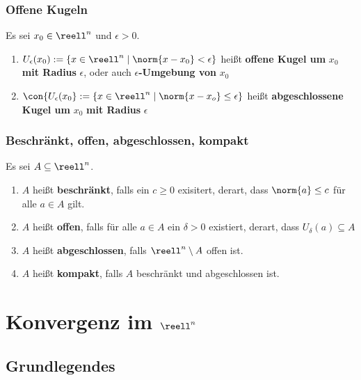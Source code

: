 \documentclass{kit}
\begin{document}
    \subsubsection{Offene Kugeln}
      Es sei $x_0\in\reell^n$ und $\epsilon>0$.
      \begin{enumerate}
        \item $U_\epsilon(x_0):=\{x\in\reell^n\mid\norm{x-x_0}<\epsilon\}$ heißt \textbf{offene Kugel um} $x_0$ 
        \textbf{mit Radius} $\epsilon$, oder auch $\epsilon$\textbf{-Umgebung von} $x_0$
      \item $\con{U_\epsilon(x_0}:=\{x\in\reell^n\mid\norm{x-x_o}\le\epsilon\}$ heißt \textbf{abgeschlossene Kugel um}
        $x_0$ \textbf{mit Radius} $\epsilon$
      \end{enumerate}
    \subsubsection{Beschränkt, offen, abgeschlossen, kompakt}
      Es sei $A\subseteq\reell^n$.
      \begin{enumerate}
        \item $A$ heißt \textbf{beschränkt}, falls ein $c\ge0$ exisitert, derart, dass $\norm{a}\le c$ für alle $a\in A$ 
          gilt.
        \item $A$ heißt \textbf{offen}, falls für alle $a\in A$ ein $\delta>0$ existiert, derart, dass 
          $U_\delta(a)\subseteq A$
        \item $A$ heißt \textbf{abgeschlossen}, falls $\reell^n\setminus A$ offen ist.
        \item $A$ heißt \textbf{kompakt}, falls $A$ beschränkt und abgeschlossen ist.
      \end{enumerate}
\section{Konvergenz im \texorpdfstring{$\reell^n$}{}}
  \subsection{Grundlegendes}
\end{document}
